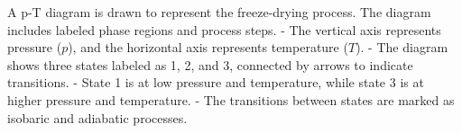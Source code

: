 A p-T diagram is drawn to represent the freeze-drying process. The diagram includes labeled phase regions and process steps.  
- The vertical axis represents pressure (\( p \)), and the horizontal axis represents temperature (\( T \)).  
- The diagram shows three states labeled as 1, 2, and 3, connected by arrows to indicate transitions.  
- State 1 is at low pressure and temperature, while state 3 is at higher pressure and temperature.  
- The transitions between states are marked as isobaric and adiabatic processes.